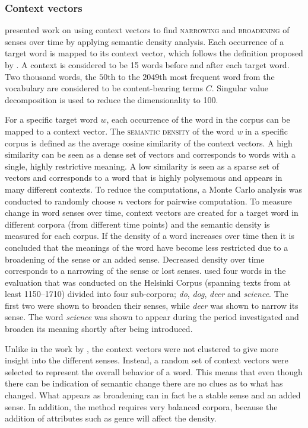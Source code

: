 \documentclass[output=paper]{langsci/langscibook}
\begin{document}
\subsubsection{Context vectors}    \label{sec:emb}
    
    \citet{sagi-etal-2009-semantic} presented work on using context vectors to find \textsc{narrowing} and \textsc{broadening} of senses over time by applying semantic density analysis. Each occurrence of a target word is mapped to its context vector, which follows the definition proposed by \citet{schutze1998}.  A context is considered to be 15 words before and after each target word.
    Two thousand words, the $50$th to the $2049$th most frequent word from the vocabulary are considered to be content-bearing terms $C$. Singular value decomposition is used to reduce the dimensionality to 100.

For a specific target word $w$, each occurrence of the word in the corpus can be mapped to a context vector. The \textsc{semantic density} of the word \textit{w} in a specific corpus is defined as the average cosine similarity of the context vectors. A high similarity can be seen as a dense set of vectors and corresponds to words with a single, highly restrictive meaning. A low similarity is seen as a sparse set of vectors and corresponds to a word that is highly polysemous and appears in many different contexts.  To reduce the computations, a Monte Carlo analysis was conducted to randomly choose $n$ vectors for pairwise computation.
To measure change in word senses over time, context vectors are created for a target word in different corpora (from different time points) and the semantic density is measured for each corpus. If the density of a word increases over time then it is concluded that the meanings of the word have become less restricted due to a broadening of the sense or an added sense. Decreased density over time corresponds to a narrowing of the sense or lost senses.  
\citet{sagi-etal-2009-semantic} used four words in the evaluation that was conducted on the Helsinki Corpus (spanning texts from at least 1150--1710) divided into four sub-corpora; \emph{do}, \emph{dog}, \emph{deer} and \emph{science}. The first two were shown to broaden their senses, while \emph{deer} was shown to narrow its sense. The word \emph{science} was shown to appear during the  period investigated and broaden its meaning shortly after being introduced. 

Unlike in the work by \citet{schutze1998}, the context vectors were not clustered to give more insight into the different senses. Instead, a random set of context vectors were selected 
to represent the overall behavior of a word. This means that even though there can be indication of semantic change there are no clues as to what has changed. What appears as broadening can in fact be a stable sense and an added sense. In addition, the method requires very balanced corpora, because the addition of attributes such as genre will affect the density. 
\end{document}
